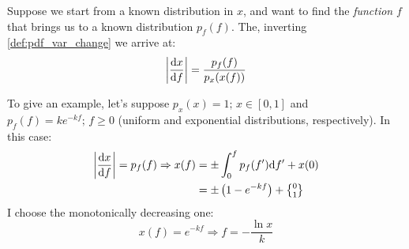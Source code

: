 \begin{example}
	Suppose we start from a known distribution in $x$, and want to find the \emph{function} $f$ that brings us to a known distribution $p_f(f)$. The, inverting \ref{def:pdf_var_change} we arrive at:
	\[
	\left| \frac{\mathrm{d} x}{\mathrm{d} f} \right| = \frac{p_f(f)}{p_x(x(f))}
	\]
	
	To give an example, let's suppose $p_x(x) = 1; \, x\in[0,1]$ and $p_f(f) = ke^{-kf}; \, f\geq 0$ (uniform and exponential distributions, respectively). In this case:
	\begin{align*}
	\left| \dv{x}{f} \right| = p_f(f) \Rightarrow x(f) &= \pm \int_0^f p_f(f^\prime)\dd f^\prime + x(0) \\
	&= \pm\left( 1-e^{-kf}\right) + \genfrac{\{}{\}}{0pt}{1}{0}{1}
	\end{align*}
	I choose the monotonically decreasing one:
	\[
	x(f) = e^{-kf} \Rightarrow f = -\frac{\ln{x}}{k}
	\]
\end{example}


